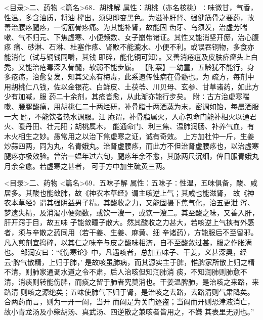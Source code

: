\documentclass[a4paper,12pt,UTF8,twoside]{ctexbook}
\begin{document}
<目录>二、药物
<篇名>68．胡桃解
属性：胡桃（亦名核桃）∶味微甘，气香，性温。多含油质，将油 
榨出，须臾即变黑色。为滋补肝肾、强健筋骨之要药，故善治腰疼腿疼，一切筋骨疼痛。为其能补肾，故能固 
齿牙、乌须发，治虚劳喘嗽、气不归元、下焦虚寒、小便频数、女子崩带诸证。其性又能消坚开瘀，治心腹疼 
痛、砂淋、石淋、杜塞作疼、肾败不能漉水、小便不利。或误吞铜物，多食亦能消化（试与铜钱同嚼，其钱 
即碎，能化铜可知）。又善消疮疽及皮肤疥癣头上白秃，又能治疮毒深入骨髓，软弱不能步履。 
【附案】一幼童，五龄犹不能行，身多疮疡，治愈复发，知其父素有梅毒，此系遗传性病在骨髓也。为 
疏方，每剂中用胡桃仁八钱，佐以金银花、白鲜皮、土茯苓、川贝母、玄参、甘草诸药，如此方少有加减，服 
药二十余剂，其疮皆愈，从此渐亦能行步矣。 
附∶古方治虚寒喘嗽、腰腿酸痛，用胡桃仁二十两烂研，补骨脂十两酒蒸为末，密调如饴，每晨酒服一大 
匙，不能饮者热水调服。汪 庵谓，补骨脂属火，入心包命门能补相火以通君火、暖丹田、壮元阳；胡桃属木， 
能通命门、利三焦、温肺润肠、补养气血，有木火相生之妙。愚常用之以治下焦虚寒之证，诚有奇效。 
上方加杜仲一斤，生姜炒蒜四两，同为丸，名青娥丸。治肾虚腰疼，而此方不但治肾虚腰疼也，以治虚寒 
腿疼亦极效验。曾治一媪年过六旬，腿疼年余不愈，其脉两尺沉细，俾日服青娥丸月余全愈。若虚寒之甚者， 
可于方中加生硫黄三两。 

<目录>二、药物
<篇名>69．五味子解
属性：五味子∶性温，五味俱备，酸、咸居多。其酸也能敛肺，故《神农本草经》谓主咳逆上气；其咸也能滋肾， 
故《神农本草经》谓其强阴益男子精。其酸收之力，又能固摄下焦气化，治五更泄 
泻、梦遗失精，及消渴小便频数，或饮一溲一，或饮一溲二。其至酸之味，又善入肝，肝开窍于目，故五味 
子能敛瞳子散大。然其酸收之力甚大，若咳逆上气挟有外感者，须与辛散之药同用（若干姜、生姜、麻黄、细 
辛诸药），方能服后不至留邪。凡入煎剂宜捣碎，以其仁之味辛与皮之酸味相济，自不至酸敛过甚，服之作胀满也。 
邹润安曰∶“《伤寒论》中，凡遇咳者，总加五味子、干姜，义甚深奥，经云‘脾气散精，上归于肺，’ 
是故咳虽肺病，而其源实主于脾，惟脾家所散上归之精不清，则肺家通调水道之令不肃，后人治咳但知润肺消 
痰，不知润肺则肺愈不清，消痰则转能伤脾，而痰之留于肺者究莫消也。干姜温脾肺，是治咳之来路，来路清 
则咳之源绝矣；五味使肺气下归于肾，是治咳之去路，去路清则气肃降矣。合两药而言，则为一开一阖，当开 
而阖是为关门逐盗；当阖而开则恐津液消亡，故小青龙汤及小柴胡汤、真武汤、四逆散之兼咳者皆用之，不嫌 
其表里无别也。” 
\end{document}
